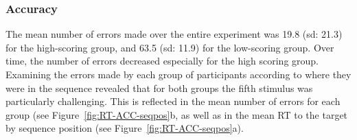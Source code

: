 \documentclass[man,floatsintext]{apa6}
\begin{document}

\subsubsection{Accuracy}

The mean number of errors made over the entire experiment was 19.8 (sd: 21.3) for the high-scoring group, and 63.5 (sd: 11.9) for the low-scoring group. Over time, the number of errors decreased especially for the high scoring group. Examining the errors made by each group of participants according to where they were in the sequence revealed that for both groups the fifth stimulus was particularly challenging. This is reflected in the mean number of errors for each group (see Figure~\ref{fig:RT-ACC-seqpos}b, as well as in the mean RT to the target by sequence position (see Figure~\ref{fig:RT-ACC-seqpos}a).

%
\end{document}
